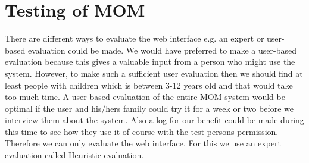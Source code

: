 \chapter{Testing of MOM}
There are different ways to evaluate the web interface e.g. an expert or user-based evaluation could be made. We would have preferred to make a user-based evaluation because this gives a valuable input from a person who might use the system. However, to make such a sufficient user evaluation then we should find at least people with children which is between 3-12 years old and that would take too much time. A user-based evaluation of the entire MOM system would be optimal if the user and his/hers family could try it for a week or two before we interview them about the system. Also a log for our benefit could be made during this time to see how they use it of course with the test persons permission. Therefore we can only evaluate the web interface. For this we use an expert evaluation called Heuristic evaluation. 

